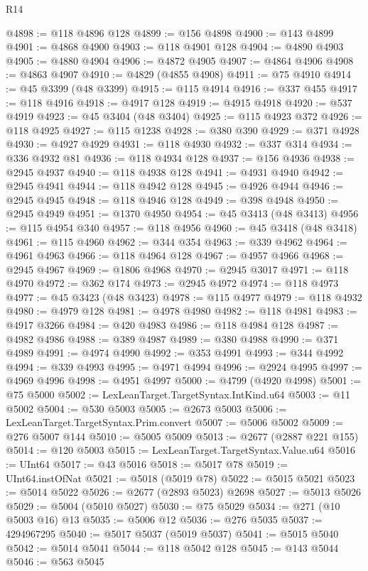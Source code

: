 \begin{lexlean}{R14}
\begin{coremodule}
@4898 := @118 @4896 @128
@4899 := @156 @4898
@4900 := @143 @4899
@4901 := @4868 @4900
@4903 := @118 @4901 @128
@4904 := @4890 @4903
@4905 := @4880 @4904
@4906 := @4872 @4905
@4907 := @4864 @4906
@4908 := @4863 @4907
@4910 := @4829 (@4855 @4908)
@4911 := @75 @4910
@4914 := @45 @3399 (@48 @3399)
@4915 := @115 @4914
@4916 := @337 @455
@4917 := @118 @4916
@4918 := @4917 @128
@4919 := @4915 @4918
@4920 := @537 @4919
@4923 := @45 @3404 (@48 @3404)
@4925 := @115 @4923 @372
@4926 := @118 @4925
@4927 := @115 @1238
@4928 := @380 @390
@4929 := @371 @4928
@4930 := @4927 @4929
@4931 := @118 @4930
@4932 := @337 @314
@4934 := @336 @4932 @81
@4936 := @118 @4934 @128
@4937 := @156 @4936
@4938 := @2945 @4937
@4940 := @118 @4938 @128
@4941 := @4931 @4940
@4942 := @2945 @4941
@4944 := @118 @4942 @128
@4945 := @4926 @4944
@4946 := @2945 @4945
@4948 := @118 @4946 @128
@4949 := @398 @4948
@4950 := @2945 @4949
@4951 := @1370 @4950
@4954 := @45 @3413 (@48 @3413)
@4956 := @115 @4954 @340
@4957 := @118 @4956
@4960 := @45 @3418 (@48 @3418)
@4961 := @115 @4960
@4962 := @344 @354
@4963 := @339 @4962
@4964 := @4961 @4963
@4966 := @118 @4964 @128
@4967 := @4957 @4966
@4968 := @2945 @4967
@4969 := @1806 @4968
@4970 := @2945 @3017
@4971 := @118 @4970
@4972 := @362 @174
@4973 := @2945 @4972
@4974 := @118 @4973
@4977 := @45 @3423 (@48 @3423)
@4978 := @115 @4977
@4979 := @118 @4932
@4980 := @4979 @128
@4981 := @4978 @4980
@4982 := @118 @4981
@4983 := @4917 @3266
@4984 := @420 @4983
@4986 := @118 @4984 @128
@4987 := @4982 @4986
@4988 := @389 @4987
@4989 := @380 @4988
@4990 := @371 @4989
@4991 := @4974 @4990
@4992 := @353 @4991
@4993 := @344 @4992
@4994 := @339 @4993
@4995 := @4971 @4994
@4996 := @2924 @4995
@4997 := @4969 @4996
@4998 := @4951 @4997
@5000 := @4799 (@4920 @4998)
@5001 := @75 @5000
@5002 := LexLeanTarget.TargetSyntax.IntKind.u64
@5003 := @11 @5002
@5004 := @530 @5003
@5005 := @2673 @5003
@5006 := LexLeanTarget.TargetSyntax.Prim.convert
@5007 := @5006 @5002
@5009 := @276 @5007 @144
@5010 := @5005 @5009
@5013 := @2677 (@2887 @221 @155)
@5014 := @120 @5003
@5015 := LexLeanTarget.TargetSyntax.Value.u64
@5016 := UInt64
@5017 := @43 @5016
@5018 := @5017 @78
@5019 := UInt64.instOfNat
@5021 := @5018 (@5019 @78)
@5022 := @5015 @5021
@5023 := @5014 @5022
@5026 := @2677 (@2893 @5023) @2698
@5027 := @5013 @5026
@5029 := @5004 (@5010 @5027)
@5030 := @75 @5029
@5034 := @271 (@10 @5003 @16) @13
@5035 := @5006 @12
@5036 := @276 @5035
@5037 := 4294967295
@5040 := @5017 @5037 (@5019 @5037)
@5041 := @5015 @5040
@5042 := @5014 @5041
@5044 := @118 @5042 @128
@5045 := @143 @5044
@5046 := @563 @5045

\end{coremodule}
\end{lexlean}
